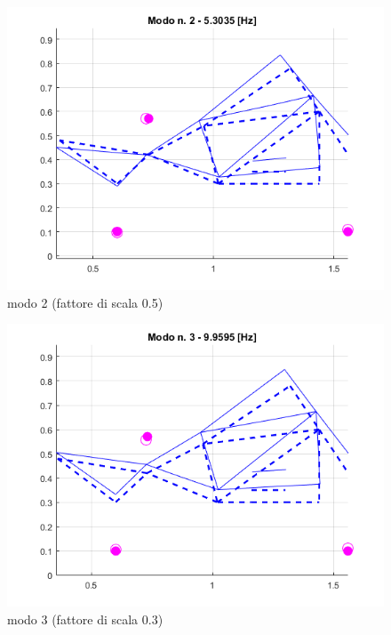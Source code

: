 \documentclass[12pt, a4paper]{article}
\begin{document}
	\begin{figure}[h]
		\centering
		\includegraphics[scale=0.6]{modo_2}
		\caption{modo 2 (fattore di scala 0.5)}
	\end{figure}
	\begin{figure}[h]
		\centering
		\includegraphics[scale=0.6]{modo_3}
		\caption{modo 3 (fattore di scala 0.3)}
	\end{figure}
\end{document}
